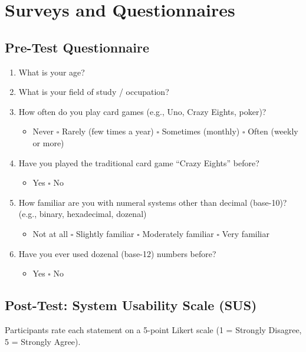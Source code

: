 \documentclass[12pt, titlepage]{article}
\begin{document}
\section{Surveys and Questionnaires}\label{sec:survey}

\subsection{Pre-Test Questionnaire}

\begin{enumerate}
  \item What is your age?
  \item What is your field of study / occupation?
  \item How often do you play card games (e.g., Uno, Crazy Eights, poker)?
  \begin{itemize}[label=$\square$]
    \item Never \quad $\square$ Rarely (few times a year) \quad $\square$ Sometimes (monthly) \quad $\square$ Often (weekly or more)
  \end{itemize}
  \item Have you played the traditional card game ``Crazy Eights'' before?
  \begin{itemize}[label=$\square$]
    \item Yes \quad $\square$ No
  \end{itemize}
  \item How familiar are you with numeral systems other than decimal (base-10)? (e.g., binary, hexadecimal, dozenal)
  \begin{itemize}[label=$\square$]
    \item Not at all \quad $\square$ Slightly familiar \quad $\square$ Moderately familiar \quad $\square$ Very familiar
  \end{itemize}
  \item Have you ever used dozenal (base-12) numbers before?
  \begin{itemize}[label=$\square$]
    \item Yes \quad $\square$ No
  \end{itemize}
\end{enumerate}

\subsection{Post-Test: System Usability Scale (SUS)}

Participants rate each statement on a 5-point Likert scale (1 = Strongly Disagree, 5 = Strongly Agree).
\end{document}

